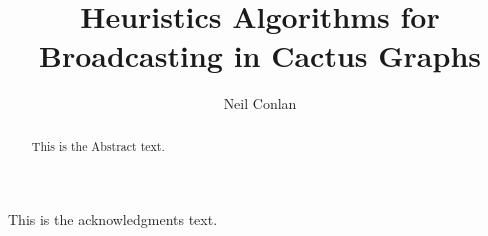 
\author{Neil Conlan}
\title{Heuristics Algorithms for Broadcasting in Cactus Graphs}
\cosupervisor                   %




\begin{abstract}
	This is the Abstract text.  
\end{abstract}

\begin{acknowledgments}
	This is the acknowledgments text.
\end{acknowledgments}





